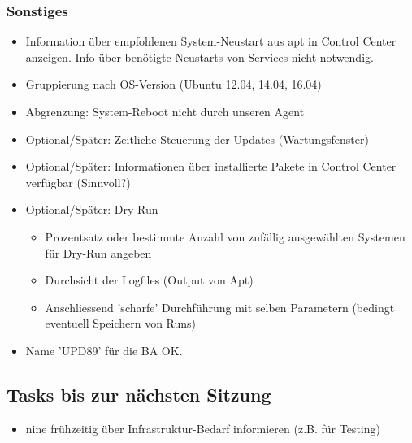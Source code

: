 \documentclass[class=scrbook,crop=false]{standalone}
\begin{document}
    \subsubsection{Sonstiges}
    
    \begin{itemize}
        \item Information über empfohlenen System-Neustart aus apt in Control Center anzeigen. Info über benötigte Neustarts von Services nicht notwendig.
        \item Gruppierung nach OS-Version (Ubuntu 12.04, 14.04, 16.04)
        \item Abgrenzung: System-Reboot nicht durch unseren Agent
        \item Optional/Später: Zeitliche Steuerung der Updates (Wartungsfenster)
        \item Optional/Später: Informationen über installierte Pakete in Control Center verfügbar (Sinnvoll?)
        \item Optional/Später: Dry-Run
        \begin{itemize}
            \item Prozentsatz oder bestimmte Anzahl von zufällig ausgewählten Systemen für Dry-Run angeben
            \item Durchsicht der Logfiles (Output von Apt)
            \item Anschliessend 'scharfe' Durchführung mit selben Parametern (bedingt eventuell Speichern von Runs)
        \end{itemize}
        \item Name 'UPD89' für die BA OK.
    \end{itemize}
    
    \subsection*{Tasks bis zur nächsten Sitzung}
    
    \begin{itemize}
        \item \gls{nine} frühzeitig über Infrastruktur-Bedarf informieren (z.B. für Testing)
    \end{itemize}
\end{document}
